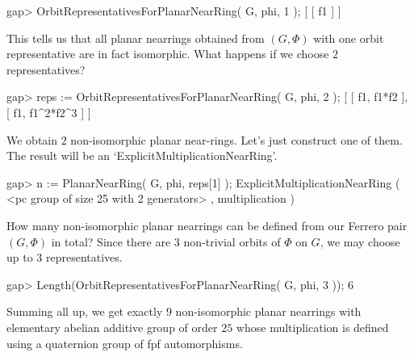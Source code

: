 \beginexample
    gap> OrbitRepresentativesForPlanarNearRing( G, phi, 1 );
    [ [ f1 ] ]
\endexample

This tells us that all planar nearrings obtained from $(G,\Phi)$ with one
orbit representative are in fact isomorphic. 
What happens if we choose $2$ representatives?

\beginexample
    gap> reps := OrbitRepresentativesForPlanarNearRing( G, phi, 2 );
    [ [ f1, f1*f2 ], [ f1, f1^2*f2^3 ] ]
\endexample

We obtain $2$ non-isomorphic planar near-rings. Let's just construct one of
them. The result will be an `ExplicitMultiplicationNearRing'.

\beginexample
    gap> n := PlanarNearRing( G, phi, reps[1] );
    ExplicitMultiplicationNearRing ( <pc group of size 25 with 
    2 generators> , multiplication )
\endexample

How many non-isomorphic planar nearrings can be defined from our Ferrero pair
$(G,\Phi)$ in total? Since there are $3$ non-trivial orbits of $\Phi$ on $G$,
we may choose up to $3$ representatives.
 
\beginexample
    gap> Length(OrbitRepresentativesForPlanarNearRing( G, phi, 3 ));
    6
\endexample

Summing all up, we get exactly $9$ non-isomorphic planar nearrings with 
elementary abelian additive group of order $25$ whose multiplication is
defined using a quaternion group of fpf automorphisms. 



